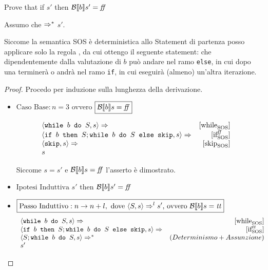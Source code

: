          {
           Prove that if  \Rar{*} $s'$ then $\B{b}' = \semfalse$
         }
         {
           Assumo che  $\Rar{*}$ $s'$.

           Siccome la semantica SOS è deterministica allo Statement di
           partenza posso applicare solo la regola \whileSOS, da cui ottengo
           il seguente statement:
           che dipendentemente dalla valutazione di $b$ può andare nel ramo
           \texttt{else}, in cui dopo una \skipForFriends{} terminerà o andrà nel ramo
           \texttt{if}, in cui eseguirà (almeno) un'altra iterazione.

           \begin{proof}
                        Procedo per induzione sulla lunghezza della derivazione.

           \begin{itemize}
             \item $\boxed{\text{Caso Base}: n = 3}$ ovvero 
           $\boxed{\B{b} = \semfalse}$ 

          $$
          \begin{array}{lrr}
    \confSs{\wbS{b}{S}}{s} \Rar{} & \whileSOS & \\
    \confSs{\ifABC{b}{S; \wbS{b}{S}}{\skipForFriends}}{s} \Rar{} & \ifffSOS & \\
    \confSs{\skipForFriends}{s} \Rar{} & \skipSOS & \\
    s & & \\
          \end{array}
          $$

           Siccome $s = s'$ e $\B{b} = \semfalse$ l'asserto è dimostrato.

           \item $\boxed{\text{Ipotesi Induttiva}} $  \Rar{*} $s'$ then $\B{b}' = \semfalse$

           \item $\boxed{\text{Passo Induttivo}: n \rightarrow n + l,
             \text{ dove } \confSs{S}{s} \Rar{l} s' \text{, ovvero } \B{b} = \semtrue}$
          $$
          \begin{array}{lrr}
    \confSs{\wbS{b}{S}}{s} \Rar{} & \whileSOS & \\
    \confSs{\ifABC{b}{S; \wbS{b}{S}}{\skipForFriends}}{s} \Rar{} & \ifttSOS & \\
    \confSs{S; \wbS{b}{S}}{s} \Rar{*} & (Determinismo + Assunzione) & \\
    s' & & \\
          \end{array}
          $$


\end{itemize}
\end{proof}}
